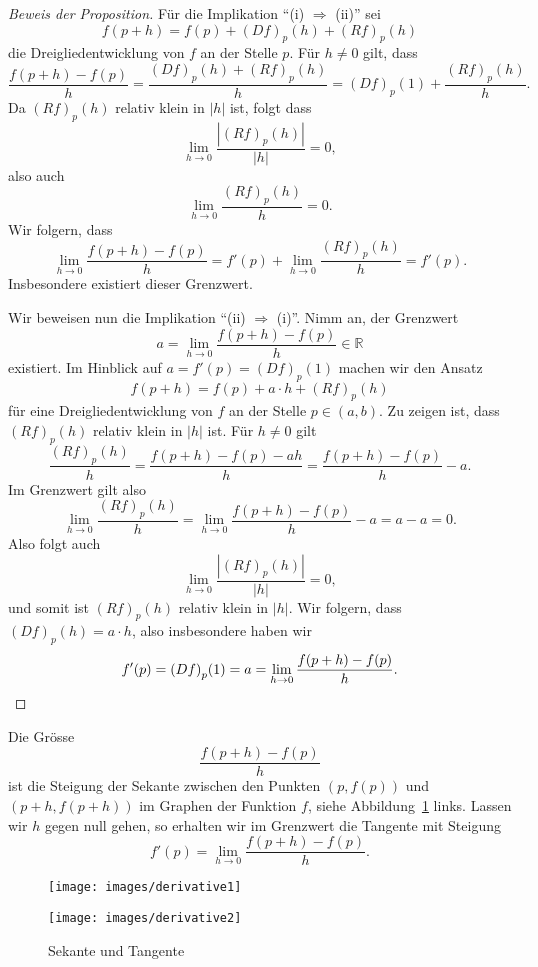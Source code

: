 \documentclass[../main.tex]{subfiles}
\begin{document}
\begin{proof}[Beweis der Proposition]
  Für die Implikation ``(i) $\Rightarrow$ (ii)''
  sei
  \[
    f(p + h) = f(p) + {(Df)}_p(h) + {(Rf)}_p(h)
  \]
  die Dreigliedentwicklung von $f$ an der
  Stelle $p$.
  Für $h \neq 0$ gilt, dass
  \[
    \frac{f(p + h) - f(p)}{h}
    = \frac{{(Df)}_p(h) + {(Rf)}_p(h)}{h}
    ={(Df)}_p(1) + \frac{{(Rf)}_p(h)}{h}.
  \]
  Da ${(Rf)}_p(h)$ relativ klein in $|h|$ ist,
  folgt dass
  \[
    \lim_{h \to 0} \frac{|{(Rf)}_p(h)|}{|h|} = 0,
  \]
  also auch
  \[
    \lim_{h \to 0} \frac{{(Rf)}_p(h)}{h} = 0.
  \]
  Wir folgern, dass
  \[
    \lim_{h \to 0} \frac{f(p + h) - f(p)}{h}
    = f'(p) + \lim_{h \to 0} \frac{{(Rf)}_p(h)}{h} = f'(p).
  \]
  Insbesondere existiert dieser Grenzwert.

  Wir beweisen nun die Implikation
  ``(ii) $\Rightarrow$ (i)''.
  Nimm an, der Grenzwert
  \[
    a = \lim_{h \to 0} \frac{f(p+h) - f(p)}{h} \in \mathbb{R}
  \]
  existiert.
  Im Hinblick auf $a = f'(p) = {(Df)}_p(1)$
  machen wir den Ansatz
  \[
    f(p + h) = f(p) + a \cdot h + {(Rf)}_p(h)
  \]
  für eine Dreigliedentwicklung von $f$ an der Stelle
  $p \in (a, b)$. Zu zeigen ist, dass
  ${(Rf)}_p(h)$ relativ klein in $|h|$ ist.
  Für $h \neq 0$ gilt
  \[
    \frac{{(Rf)}_p(h)}{h} =
    \frac{f(p+h) - f(p) - ah}{h}
    = \frac{f(p+h) - f(p)}{h} - a.
  \]
  Im Grenzwert gilt also
  \[
    \lim_{h \to 0} \frac{{(Rf)}_p(h)}{h}
    = \lim_{h \to 0}
    \frac{f(p + h) - f(p)}{h} - a
    = a - a = 0.
  \]
  Also folgt auch
  \[
    \lim_{h \to 0} \frac{|{(Rf)}_p(h)|}{|h|} = 0,
  \]
  und somit ist ${(Rf)}_p(h)$ relativ klein
  in $|h|$.
  Wir folgern, dass ${(Df)}_p(h) = a \cdot h$,
  also insbesondere haben wir
  \[
    f'(p) = {(Df)}_p(1) = a =
    \lim_{h \to 0} \frac{f(p + h) - f(p)}{h}. \qedhere
  \]
\end{proof}

\begin{geometric}
  Die Grösse
  \[
    \frac{f(p+h) - f(p)}{h}
  \]
  ist die Steigung der Sekante
  zwischen den Punkten $(p, f(p))$
  und $(p + h, f(p+h))$ im Graphen
  der Funktion $f$, siehe Abbildung~\ref{fig:derivative}
  links.
  Lassen wir $h$ gegen null gehen,
  so erhalten wir im Grenzwert die Tangente
  mit Steigung
  \[
    f'(p) = \lim_{h \to 0} \frac{f(p + h) - f(p)}{h}.
  \]
\end{geometric}

\begin{figure}[htb]
  \centering
  \begin{minipage}{0.4\textwidth}
    \centering
    \texttt{[image: images/derivative1]}
  \end{minipage}%
  \begin{minipage}{0.4\textwidth}
    \centering
    \texttt{[image: images/derivative2]}
  \end{minipage}%
  \caption{Sekante und Tangente}%
  \label{fig:derivative}
\end{figure}
\end{document}
